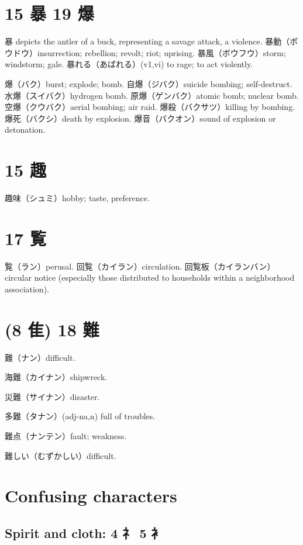 \section{15 暴 19 爆}

暴 depicts the antler of a buck, representing a savage attack, a violence.
暴動（ボウドウ）insurrection; rebellion; revolt; riot; uprising.
暴風（ボウフウ）storm; windstorm; gale.
暴れる（あばれる）(v1,vi) to rage; to act violently.

爆（バク）burst; explode; bomb.
自爆（ジバク）suicide bombing; self-destruct.
水爆（スイバク）hydrogen bomb.
原爆（ゲンバク）atomic bomb; nuclear bomb.
空爆（クウバク）aerial bombing; air raid.
爆殺（バクサツ）killing by bombing.
爆死（バクシ）death by explosion.
爆音（バクオン）sound of explosion or detonation.

\section{15 趣}

趣味（シュミ）hobby; taste, preference.

\section{17 覧}

覧（ラン）perusal.
回覧（カイラン）circulation.
回覧板（カイランバン）circular notice
(especially those distributed to households within a neighborhood association).

\section{(8 隹) 18 難}

難（ナン）difficult.

海難（カイナン）shipwreck.

災難（サイナン）disaster.

多難（タナン）(adj-na,n) full of troubles.

難点（ナンテン）fault; weakness.

難しい（むずかしい）difficult.

\section{Confusing characters}

\subsection{Spirit and cloth: 4 礻 5 衤}

